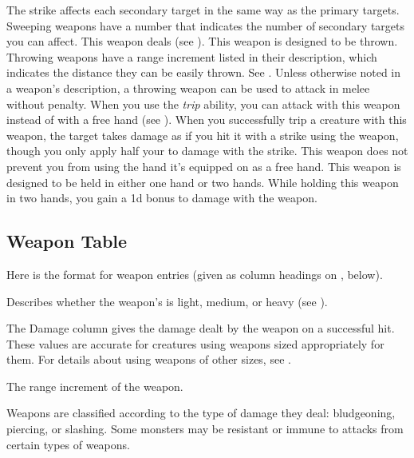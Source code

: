             The strike affects each secondary target in the same way as the primary targets.
            Sweeping weapons have a number that indicates the number of secondary targets you can affect.
             This weapon deals  (see ).
             This weapon is designed to be thrown. Throwing weapons have a range increment listed in their description, which indicates the distance they can be easily thrown. See .
            Unless otherwise noted in a weapon's description, a throwing weapon can be used to attack in melee without penalty.
             When you use the \textit{trip} ability, you can attack with this weapon instead of with a free hand (see ).
            When you successfully trip a creature with this weapon, the target takes damage as if you hit it with a strike using the weapon, though you only apply half your  to damage with the strike.
             This weapon does not prevent you from using the hand it's equipped on as a free hand.
             This weapon is designed to be held in either one hand or two hands.
            While holding this weapon in two hands, you gain a \plus1d bonus to damage with the weapon.

    \subsection{Weapon Table}
        Here is the format for weapon entries (given as column headings on , below).

         Describes whether the weapon's  is light, medium, or heavy (see ).

         The Damage column gives the damage dealt by the weapon on a successful hit.
        These values are accurate for creatures using weapons sized appropriately for them.
        For details about using weapons of other sizes, see .

         The range increment of the weapon.

         Weapons are classified according to the type of damage they deal: bludgeoning, piercing, or slashing. Some monsters may be resistant or immune to attacks from certain types of weapons.


